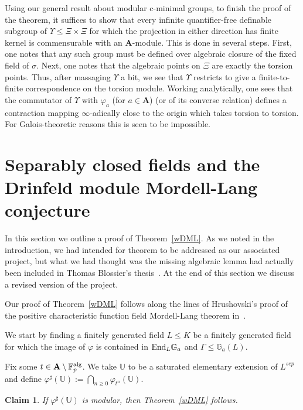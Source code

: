 \documentclass{amsart}
\newcommand{\Ga}{{{\mathbb G}_a}}
\newcommand{\FF}{{\mathbb F}}
\newcommand{\UU}{{\mathbb U}}
\newcommand{\bA}{{\mathbf A}}
\newcommand{\alg}{{\rm alg}}
\newtheorem{claim}[thm]{Claim}
\theoremstyle{definition}
\theoremstyle{remark}
\begin{document}
Using our general result about modular c-minimal groups, to finish the proof of the theorem, it
suffices to show that every infinite quantifier-free 
definable subgroup of $\Upsilon \leq \Xi \times \Xi$ for which the projection in 
either direction has finite kernel is commensurable with 
an $\bA$-module.  This is done in several steps.   First, one notes that any such group must 
be defined over algebraic closure of the fixed field of $\sigma$.  Next, one notes that the algebraic 
points on $\Xi$ are exactly the torsion points.  Thus, after massaging $\Upsilon$ a bit, we
see that $\Upsilon$ restricts to give a finite-to-finite correspondence on the torsion module.
Working analytically, one sees that the commutator of $\Upsilon$ with $\varphi_a$ (for $a \in \bA$)
(or of its converse relation) defines a contraction mapping $\infty$-adically close to the origin 
which takes torsion to torsion.  For Galois-theoretic reasons this is seen to be impossible.





\section{Separably closed fields and the Drinfeld module Mordell-Lang conjecture}
\label{SCFDML}

In this section we outline a proof of Theorem~\ref{wDML}.  As we noted in the
introduction, we had intended for theorem to be addressed as our associated
project, but what we had thought was the missing algebraic lemma had actually
been included in Thomas Blossier's thesis~\cite{Blossier}.  At the end of this
section we discuss a revised version of the project.


Our proof of Theorem~\ref{wDML} follows along the lines of Hrushovski's proof 
of the positive characteristic function field Mordell-Lang theorem in~\cite{HrML}.


We start by finding a finitely generated field  
$L \leq K$ be a finitely generated field for which 
the image of $\varphi$ is contained in ${\rm End}_L \Ga$
and $\Gamma \leq \Ga(L)$.   

Fix some $t \in {\mathbf A} \setminus \FF_p^\alg$. 
We take $\UU$ to be a saturated elementary extension of $L^{sep}$ and 
define $\varphi^\sharp(\UU) := \bigcap_{n \geq 0} \varphi_{t^n}(\UU)$.  

\begin{claim}
If $\varphi^\sharp(\UU)$ is modular, then Theorem~\ref{wDML} follows.
\end{claim}
\end{document}
